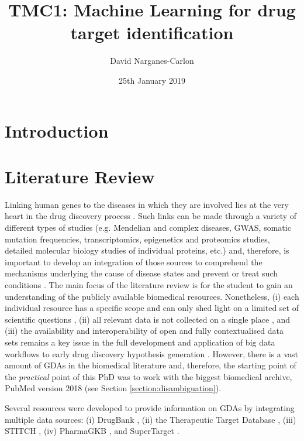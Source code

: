 \documentclass{article}
\title{\textbf{TMC1}:
Machine Learning for drug target identification}
\author{David Narganes-Carlon}
\date{25th January 2019}
\begin{document}
\maketitle
\tableofcontents
\newpage

\section{Introduction}


\section{Literature Review}
\label{section:lit_review}

Linking human genes to the diseases in which they are involved lies at the very heart in the drug discovery process \cite{DISEASES2015,ferrero2017,brown2018}. Such links can be made through a variety of different types of studies (e.g. Mendelian and complex diseases, GWAS, somatic mutation frequencies, transcriptomics, epigenetics and proteomics studies, detailed molecular biology studies of individual proteins, etc.) and, therefore, is important to develop an integration of those sources to comprehend the mechanisms underlying the cause of disease states and prevent or treat such conditions \cite{DISEASES2015,ferrero2017,brown2018}. The main focus of the literature review is for the student to gain an understanding of the publicly available biomedical resources. Nonetheless, (i) each individual resource has a specific scope and can only shed light on a limited set of scientific questions \cite{brown2018,DISEASES2015}, (ii) all relevant data is not collected on a single place \cite{brown2018,DisGeNET2015}, and (iii) the availability and interoperability of open and fully contextualised data sets remains a key issue in the full development and application of big data workflows to early drug discovery hypothesis generation \cite{brown2018}. However, there is a vast amount of GDAs in the biomedical literature and, therefore, the starting point of the \emph{practical} point of this PhD was to work with the biggest biomedical archive, PubMed version 2018 (see Section \ref{section:disambiguation}).

Several resources were developed to provide information on GDAs by integrating multiple data sources: (i) DrugBank \cite{drugbank2008}, (ii) the Therapeutic Target Database \cite{ttd2018}, (iii) STITCH \cite{stitch42014}, (iv) PharmaGKB \cite{pharmaGSK2012}, and SuperTarget \cite{superTarget2012}.
\end{document}
